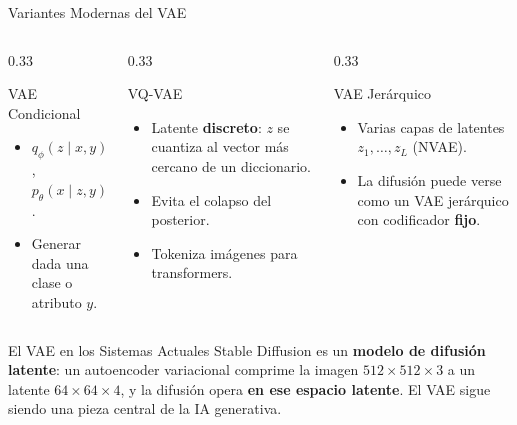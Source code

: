 \documentclass[aspectratio=169, 10pt]{beamer}
\begin{document}
\begin{frame}{Variantes Modernas del VAE}

	\begin{columns}[T]
		\begin{column}{0.33\textwidth}
			\begin{block}{VAE Condicional}
				\small
				\begin{itemize}
					\item $q_\phi(z\mid x, y)$, $p_\theta(x\mid z, y)$.
					\item Generar dada una clase o atributo $y$.
				\end{itemize}
			\end{block}
		\end{column}

		\begin{column}{0.33\textwidth}
			\begin{block}{VQ-VAE}
				\small
				\begin{itemize}
					\item Latente \textbf{discreto}: $z$ se cuantiza al vector m\'as cercano de un diccionario.
					\item Evita el colapso del posterior.
					\item Tokeniza im\'agenes para transformers.
				\end{itemize}
			\end{block}
		\end{column}

		\begin{column}{0.33\textwidth}
			\begin{block}{VAE Jer\'arquico}
				\small
				\begin{itemize}
					\item Varias capas de latentes $z_1, \ldots, z_L$ (NVAE).
					\item La difusi\'on puede verse como un VAE jer\'arquico con codificador \textbf{fijo}.
				\end{itemize}
			\end{block}
		\end{column}
	\end{columns}

	\vspace{0.4cm}

	\begin{alertblock}{El VAE en los Sistemas Actuales}
		Stable Diffusion es un \textbf{modelo de difusi\'on latente}: un autoencoder variacional comprime la imagen $512\times512\times3$ a un latente $64\times64\times4$, y la difusi\'on opera \textbf{en ese espacio latente}. El VAE sigue siendo una pieza central de la IA generativa.
	\end{alertblock}

\end{frame}
\end{document}
